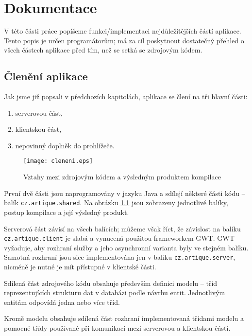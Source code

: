 \chapter{Dokumentace}

V této části práce popíšeme funkci/implementaci nejdůležitějších částí aplikace.
Tento popis je určen programátorům; má za cíl poskytnout dostatečný přehled o všech částech aplikace před tím, než se setká se zdrojovým kódem.

\section{Členění aplikace}

Jak jsme již popsali v předchozích kapitolách, aplikace se člení na tři hlavní části:
\begin{enumerate}
	\item serverovou část,
	\item klientskou část,
	\item nepovinný doplněk do prohlížeče.
\end{enumerate}

\begin{figure}
    \centering
    \texttt{[image: cleneni.eps]}
    \caption{Vztahy mezi zdrojovým kódem a výsledným produktem kompilace}
    \label{fig:cleneni}
\end{figure}

První dvě části jsou naprogramovány v jazyku Java a sdílejí některé části kódu -- balík \verb|cz.artique.shared|.
Na obrázku \ref{fig:cleneni} jsou zobrazeny jednotlivé balíky, postup kompilace a její výsledný produkt.

Serverová část závisí na všech balících; můžeme však říct, že závislost na balíku \verb|cz.artique.client| je slabá a vynucená použitou frameworkem GWT.
GWT vyžaduje, aby rozhraní služby a jeho asynchronní varianta byly ve stejném balíku.
Samotná rozhraní jsou sice implementována jen v balíku \verb|cz.artique.server|, nicméně je nutné je mít přístupné v klientské části.

Sdílená část zdrojového kódu obsahuje především definici modelu -- tříd reprezentujících strukturu dat v databázi podle návrhu entit.
Jednotlivým entitám odpovídá jedna nebo více tříd.

Kromě modelu obsahuje sdílená část rozhraní implementovaná třídami modelu a pomocné třídy používané při komunikaci mezi serverovou a klientskou částí.

\bigskip

